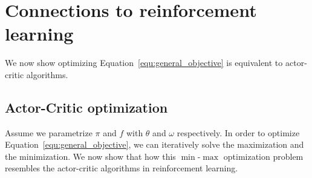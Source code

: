 \section{Connections to reinforcement learning}
We now show optimizing Equation~\ref{equ:general_objective} is equivalent 
to actor-critic algorithms.

\subsection{Actor-Critic optimization}
Assume we parametrize $\pi$ and $f$ with $\theta$ and $\omega$ respectively. 
In order to optimize Equation~\ref{equ:general_objective}, we can iteratively solve the maximization and the minimization. 
We now show that how this $\min$-$\max$ optimization problem resembles the actor-critic algorithms in reinforcement learning. 

